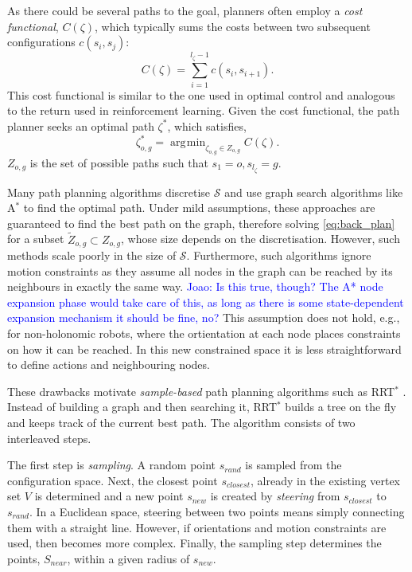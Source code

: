 \documentclass[letterpaper, 10 pt, conference]{ieeeconf}
\DeclareMathOperator*{\argmin}{\arg\!\min}
\newcommand{\jm}[1]{\textcolor{blue}{Joao: #1}}
\begin{document}
As there could be several paths to the goal, planners often employ a \emph{cost functional}, $C(\zeta)$, which typically sums the costs between two subsequent configurations $c(s_i,s_j)$:
\begin{equation}
	C(\zeta) = \sum_{i=1}^{l_{\zeta}-1} c(s_i,s_{i+1}).
\end{equation}
This cost functional is similar to the one used in optimal control and analogous to the return used in reinforcement learning. Given the cost functional, the path planner seeks an optimal path $\zeta^*$, which satisfies,
\begin{equation}
 	\zeta^*_{o,g} = \argmin_{\zeta_{o,g} \in Z_{o,g}} C(\zeta). \label{eq:back_plan}
\end{equation}
$Z_{o,g}$ is the set of possible paths such that $s_1 = o, s_{l_\zeta} = g$.

Many path planning algorithms discretise $\mathcal{S}$ and use graph search algorithms like A$^*$ to find the optimal path. Under mild assumptions, these approaches are guaranteed to find the best path on the graph, therefore solving \eqref{eq:back_plan} for a subset $\tilde{Z}_{o,g} \subset Z_{o,g}$, whose size depends on the discretisation. However, such methods scale poorly in the size of $\mathcal{S}$. Furthermore, such algorithms ignore motion constraints as they assume all nodes in the graph can be reached by its neighbours in exactly the same way. \jm{Is this true, though? The A* node expansion phase would take care of this, as long as there is some state-dependent expansion mechanism it should be fine, no?} This assumption does not hold, e.g., for non-holonomic robots, where the ortientation at each node places constraints on how it can be reached. In this new constrained space it is less straightforward to define actions and neighbouring nodes. 

These drawbacks motivate \emph{sample-based} path planning algorithms such as RRT$^*$  \cite{karaman2011sampling}. Instead of building a graph and then searching it, RRT$^*$ builds a tree on the fly and keeps track of the current best path. The algorithm consists of two interleaved steps. 

The first step is \emph{sampling}. A random point $s_{rand}$ is sampled from the configuration space. Next, the closest point $s_{closest}$, already in the existing vertex set $V$ is determined and a new point $s_{new}$ is created by \emph{steering} from  $s_{closest}$ to $s_{rand}$. In a Euclidean space, steering between two points means simply connecting them with a straight line. However, if orientations and motion constraints are used, then becomes more complex. Finally, the sampling step determines the points, $S_{near}$, within a given radius of $s_{new}$.
\end{document}
